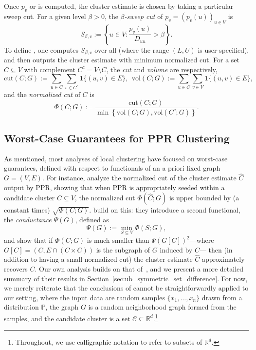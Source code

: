 \documentclass[twoside,11pt]{article}
\newcommand{\Reals}{\mathbb{R}}
\newcommand{\set}[1]{\left\{#1\right\}}
\newcommand{\1}{\mathbf{1}}
\newcommand{\Rd}{\Reals^d}
\newcommand{\mc}[1]{\mathcal{#1}}
\newcommand{\Pbb}{\mathbb{P}}
\newcommand{\wh}[1]{\widehat{#1}}
\newcommand{\vol}{\mathrm{vol}}
\newcommand{\cut}{\mathrm{cut}}
\begin{document}
Once $p_v$ or  is computed, the cluster estimate \smash{$\wh{C}$} is chosen by taking a particular sweep cut. For a given level $\beta > 0$, the \emph{$\beta$-sweep cut} of $p_v = (p_v(u))_{u \in V}$ is 
\begin{equation}
\label{eqn:sweep_cuts}
S_{\beta,v} := \set{u \in V: \frac{p_v(u)}{D_{uu}} > \beta}.
\end{equation}
To define \smash{$\wh{C}$}, one computes $S_{\beta,v}$ over all  (where the range $(L,U)$ is user-specified), and then outputs the cluster estimate \smash{$\wh{C} = S_{\beta^*,v}$} with minimum normalized cut. For a set $C \subseteq V$ with complement $C^c = V \!\setminus\! C$, the \emph{cut} and \emph{volume} are respectively,
\begin{equation}
\label{eqn:cut_volume}
\cut(C;G) := \sum_{u \in C} \sum_{v \in C^c}
\1\{(u,v) \in E\},~~ \vol(C; G) := \sum_{u \in C}  \sum_{v \in V} \1\{(u,v) \in E\},
\end{equation}
and the \emph{normalized cut} of $C$ is
\begin{equation}
\label{eqn:normalized_cut}
\Phi(C; G) := \frac{\cut(C;G)}{\min \set{\vol(C; G), \vol(C^c; G)}}.
\end{equation} 

\subsection{Worst-Case Guarantees for PPR Clustering}
As mentioned, most analyses of local clustering have focused on worst-case guarantees, defined with respect to functionals of an a priori fixed graph $G = (V,E)$.  For instance, \cite{andersen2006} analyze the normalized cut of the cluster estimate $\wh{C}$ output by PPR, showing that when PPR is appropriately seeded within a candidate cluster $C \subseteq V$, the normalized cut $\Phi(\wh{C};G)$ is upper bounded by (a constant times)  $\sqrt{\Phi(C;G)}$. \cite{zhu2013} build on this: they introduce a second functional, the \emph{conductance} $\Psi(G)$, defined as 
\begin{equation}
\label{eqn:conductance}
\Psi(G) := \min_{S \subseteq V} \Phi(S;G),
\end{equation}
and show that if $\Phi(C;G)$ is much smaller than $\Psi(G[C])^2$---where $G[C] = (C,E \cap (C \times C))$ is the subgraph of $G$ induced by $C$--- then (in addition to having a small normalized cut) the cluster estimate $\wh{C}$ approximately recovers $C$. Our own analysis builds on that of~\cite{zhu2013}, and we present a more detailed summary of their results in Section~\ref{sec:ub_symmetric_set_difference}. For now, we merely reiterate that the conclusions of \citet{andersen2006,zhu2013} cannot be straightforwardly applied to our setting, where the input data are random samples $\{x_1,\ldots,x_n\}$ drawn from a distribution $\Pbb$, the graph $G$ is a random neighborhood graph formed from the samples, and the candidate cluster is a set $\mc{C} \subseteq \Rd$.\footnote{Throughout, we use calligraphic notation to refer to subsets of $\Rd$.}
\end{document}
